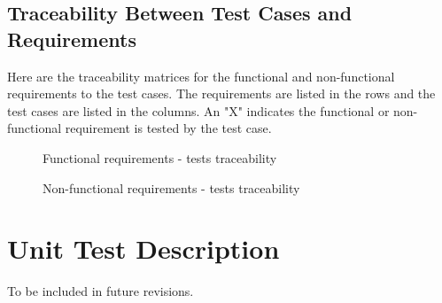 \documentclass[12pt, titlepage]{article}
\begin{document}
\subsection{Traceability Between Test Cases and Requirements}

Here are the traceability matrices for the functional and non-functional requirements to the test cases. The requirements are listed in the rows and the test cases are listed in the columns. An "X" indicates the functional or non-functional requirement is tested by the test case.

  \begin{figure}[h!]
    \caption{Functional requirements - tests traceability}
    \label{fig:fr}
  \end{figure} 
  
\begin{figure}[h!]
  \caption{Non-functional requirements - tests traceability}
  \label{fig:nfr}
\end{figure}
  
 

\section{Unit Test Description}
To be included in future revisions.





\newpage
\end{document}
